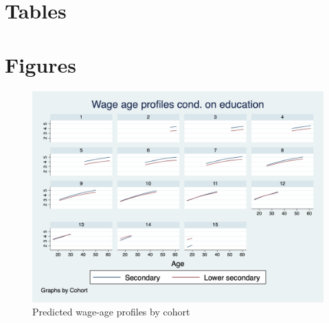 \documentclass[12pt]{article}
\begin{document}
\section{Tables}
\begin{center}
    
    
    
    
    
    
    
    
    
    
    
\end{center}


\section{Figures}
\begin{center}
    

\begin{figure}[h]
    \centering
    \includegraphics[scale=0.4]{graph1.png}
    \caption{\label{fig:pred_reg}Predicted wage-age profiles by cohort}

    \centering
    

\end{figure}
\end{center}
\end{document}
